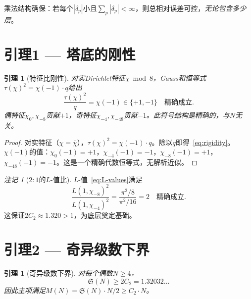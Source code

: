 \documentclass[11pt,a4paper]{article}
\newtheorem{lemma}[theorem]{引理}
\theoremstyle{remark}
\newtheorem{remark}[theorem]{注记}
\begin{document}
乘法结构确保：若每个$|\delta_p|$小且$\sum_p |\delta_p| < \infty$，则总相对误差可控，\emph{无论包含多少层}。

\section{引理1 --- 塔底的刚性}
\label{sec:rigidity}

\begin{lemma}[特征比刚性]
\label{lem:rigidity}
对实Dirichlet特征$\chi \bmod 8$，Gauss和恒等式$\tau(\chi)^2 = \chi(-1)\cdot q$给出
\begin{equation}
\label{eq:rigidity}
  \frac{\tau(\chi)^2}{q} = \chi(-1) \in \{+1, -1\} \quad \text{精确成立}.
\end{equation}
偶特征$\chi_0, \chi_{-8}$贡献$+1$，奇特征$\chi_{-4}, \chi_{-48}$贡献$-1$。此符号结构是精确的，与$N$无关。
\end{lemma}

\begin{proof}
对实特征（$\chi = \bar{\chi}$），$\tau(\chi)^2 = \chi(-1)\cdot q$。除以$q$即得~\eqref{eq:rigidity}。$\chi(-1)$的值：$\chi_0(-1) = +1$，$\chi_{-4}(-1) = -1$，$\chi_{-8}(-1) = +1$，$\chi_{-48}(-1) = -1$。这是一个精确代数恒等式，无解析近似。
\end{proof}

\begin{remark}[$2\!:\!1$的$L$-值比]
\label{rem:2to1}
$L$-值~\eqref{eq:L-values}满足
\begin{equation}
\label{eq:miracle}
  \frac{L(1,\chi_{-8})^2}{L(1,\chi_{-4})^2}
  = \frac{\pi^2/8}{\pi^2/16} = 2 \quad \text{精确成立}.
\end{equation}
这保证$2C_2 \approx 1.320 > 1$，为底层奠定基础。
\end{remark}

\section{引理2 --- 奇异级数下界}
\label{sec:sing-series-lb}

\begin{lemma}[奇异级数下界]
\label{lem:sing-series-lb}
对每个偶数$N \geq 4$，
\begin{equation}
\label{eq:SS-lower-bound}
  \mathfrak{S}(N) \geq 2C_2 = 1.32032\ldots
\end{equation}
因此主项满足$M(N) = \mathfrak{S}(N) \cdot N/2 \geq C_2 \cdot N$。
\end{lemma}
\end{document}
